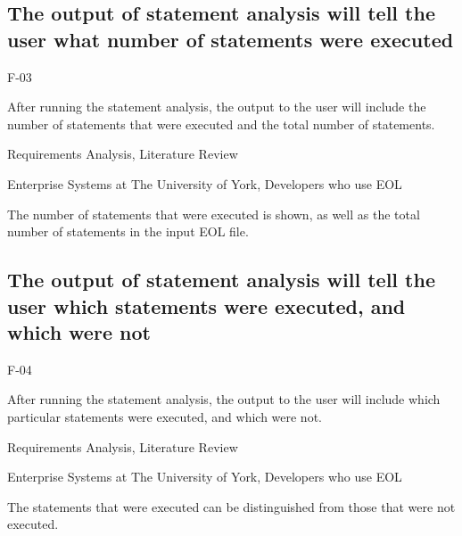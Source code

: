 \subsection{The output of statement analysis will tell the user what number of statements were executed}
\begin{description}[style=sameline,leftmargin=4.5cm,nolistsep]
\item[\hspace*{0.3cm}Label] F-03
\item[\hspace*{0.3cm}Description] After running the statement analysis, the output to the user will include the number of statements that were executed and the total number of statements.
\item[\hspace*{0.3cm}Source] Requirements Analysis, Literature Review
\item[\hspace*{0.3cm}Stakeholders] Enterprise Systems at The University of York, Developers who use EOL
\item[\hspace*{0.3cm}Satisfiable Conditions] The number of statements that were executed is shown, as well as the total number of statements in the input EOL file.
\end{description}

\subsection{The output of statement analysis will tell the user which statements were executed, and which were not}
\begin{description}[style=sameline,leftmargin=4.5cm,nolistsep]
\item[\hspace*{0.3cm}Label] F-04
\item[\hspace*{0.3cm}Description] After running the statement analysis, the output to the user will include which particular statements were executed, and which were not.
\item[\hspace*{0.3cm}Source] Requirements Analysis, Literature Review
\item[\hspace*{0.3cm}Stakeholders] Enterprise Systems at The University of York, Developers who use EOL
\item[\hspace*{0.3cm}Satisfiable Conditions] The statements that were executed can be distinguished from those that were not executed.
\end{description}

